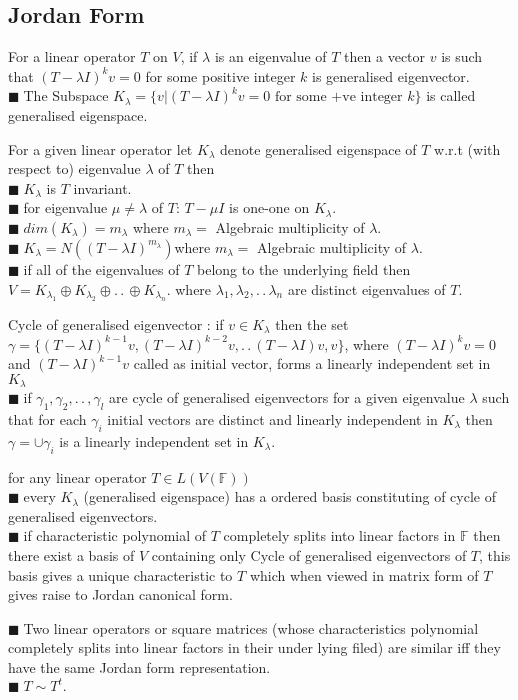 \documentclass[11pt]{extarticle}
\newcommand{\F}{\mathbb{F}}
\newcommand{\w}[1]{\text{#1}}
\newcommand{\ck}{.\,.\,}
\newcommand{\snote}[1]{{\footnotesize(#1)}}
\newcommand{\tbx}[2][]{
	\begin{tcolorbox}[enhanced,breakable,size=small,colback=black!2!white,title={#1},arc is angular, arc=1.5mm,drop fuzzy shadow]
		#2
	\end{tcolorbox}
}
\newcommand{\y}{$\blacksquare\;$}
\newcommand{\yi}{\\$\blacksquare\;$}
\begin{document}
\begin{multicols}{2}
   	   \section{Jordan Form}
   	   	\tbx[Generalised eigenvectors]{ For a linear operator $ T $ on $V$, if $ \lambda $ is an eigenvalue  of $ T $ then a vector $ v $ is such that $ (T-\lambda I)^kv=0 $ for some positive integer $ k $ is generalised eigenvector.
   	   	\yi The Subspace $ K_\lambda=\{v|(T-\lambda I)^kv=0 \w{ for some +ve integer }k\} $ is called generalised eigenspace.}
   	   	\tbx[properties of generalised eigenspaces]{
   	   	For a given linear operator let $ K_\lambda $ denote generalised eigenspace of $ T $ w.r.t (with respect to) eigenvalue $ \lambda $ of $ T $ then 
   	   		\yi $ K_\lambda $ is $ T $ invariant.
   	   		\yi  for eigenvalue $ \mu \neq \lambda $ of $ T $: $ T-\mu I $ is one-one on $ K_\lambda $.
   	   		\yi $ dim(K_\lambda)=m_\lambda $ where $ m_\lambda= $ Algebraic multiplicity of $\lambda$.    
   	   		\yi $ K_\lambda=N((T-\lambda I)^{m_\lambda}) $where $ m_\lambda= $ Algebraic multiplicity of  $\lambda$.
   	   		\yi if all of the eigenvalues of $ T $ belong to the underlying field then\\
   	   		$ V=K_{\lambda_1}\oplus K_{\lambda_2}\oplus\ck\oplus K_{\lambda_n} .$  where $ \lambda_1,\lambda_2,\ck\lambda_n  $ are distinct eigenvalues of $ T $.   }
   	   		\tbx{Cycle of generalised eigenvector : if  $ v\in K_\lambda $ then the set $ \gamma=\{(T-\lambda I)^{k-1}v,(T-\lambda I)^{k-2}v,\ck (T-\lambda I)v,v\} $, where $ (T-\lambda I)^kv=0 $ and $ (T-\lambda I)^{k-1}v $ called as initial vector, forms a linearly independent set in $ K_\lambda $
   	   		\yi if $ \gamma_1,\gamma_2,\ck, \gamma_l $ are cycle of generalised eigenvectors for a given eigenvalue $ \lambda $ such that for each $ \gamma_i $ initial vectors are distinct and linearly independent in $ K_\lambda $ then $ \gamma=\cup \gamma_i $ is a linearly independent set in $ K_\lambda $.}
   	   		\tbx[existence Jordan canonical form]{ for any linear operator $ T\in L(V(\F)) $
   	   			\yi every $ K_\lambda $ \snote{generalised eigenspace} has a ordered basis constituting of cycle of generalised eigenvectors.
   	   			\yi if characteristic polynomial of $ T $ completely splits into linear factors in $ \F $ then there exist a basis  of $V $ containing only Cycle of generalised eigenvectors of $ T $, this basis gives a unique characteristic to $ T $ which when viewed in matrix form of $ T $ gives raise to Jordan canonical form.}
   	   			\tbx[Consequences of Jordan Form ]{ \y Two linear operators or square matrices \snote{whose characteristics polynomial  completely splits into linear factors in their under lying filed} are similar iff  they have the same Jordan form representation.
   	   			\yi $ T\sim T^t. $   	   			}
   	   	

\end{multicols}
\end{document}
